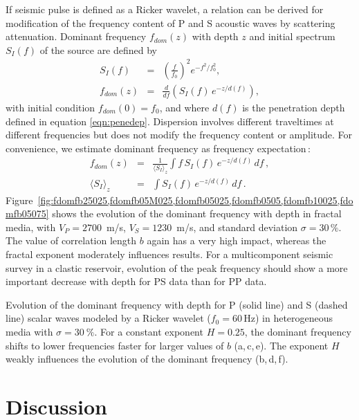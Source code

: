 If seismic pulse is defined as a Ricker wavelet, a relation can be derived for
modification of the frequency content of P and S acoustic waves by scattering attenuation. 
Dominant frequency $f_{{dom}}(z)$ with depth $z$ and initial spectrum $S_I(f)$ of the source are defined by
\begin{eqnarray}
S_I(f) & = & \left(\frac{f}{f_0}\right)^2e^{-f^2/f_0^2},\\
f_{{dom}}(z) & = & \frac{d}{df}\left(S_I(f)\,e^{-z/d(f)}\right),
\end{eqnarray}
with initial condition $f_{{dom}}(0)=f_0$, and where $d(f)$ is the penetration depth
defined in equation \ref{eqn:penedep}.
Dispersion involves different traveltimes
at different frequencies but does not modify the frequency content or amplitude.
For convenience, we estimate dominant frequency as frequency expectation\,:
\begin{eqnarray}
f_{{dom}}(z) & = & \frac{1}{\langle S_I \rangle_z}\int f\,S_I(f)\,e^{-z/d(f)}\,df\,,\\
\langle S_I \rangle_z & = & \int S_I(f)\,e^{-z/d(f)}\,df\,.
\end{eqnarray}
Figure~\ref{fig:fdomfb25025,fdomfb05M025,fdomfb05025,fdomfb0505,fdomfb10025,fdomfb05075}
shows the evolution of the dominant frequency with depth 
in fractal media, with $V_P=2700$~m/s, $V_S=1230$~m/s, and standard deviation $\sigma=30\,\%$.
The value of correlation length $b$ again has a very high impact,
whereas the fractal exponent moderately influences results.
For a multicomponent seismic survey in a clastic reservoir,
evolution of the peak frequency should show a more 
important decrease with depth for PS data than for PP data.

{Evolution of the dominant frequency with depth for P (solid line) and S (dashed line) scalar waves modeled by a Ricker wavelet ($f_0=60$\,Hz)
in heterogeneous media with $\sigma=30~\%$. For a constant exponent $H=0.25$, 
the dominant frequency shifts to lower frequencies faster for larger values of $b$ (a,\,c,\,e).
The exponent $H$ weakly influences the evolution of the dominant frequency (b,\,d,\,f).}

\section{Discussion}



